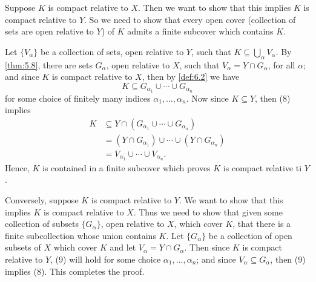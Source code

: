 \documentclass[leqno]{article}
\makeatletter
\theoremstyle{definition}
\theoremstyle{remark}
\let\oldproofname=\proofname
\renewcommand{\proofname}{\bf{\textit{\oldproofname}}}
\renewenvironment{proof}[1][\proofname]{\par
  \pushQED{\qed}%
  \normalfont \topsep6\p@\@plus6\p@\relax
  \list{}{\leftmargin=0mm
          \rightmargin=0mm
          \settowidth{\itemindent}{\itshape#1}%
          \labelwidth=4mm
          \parsep=0pt \listparindent=0mm%
  }
  \item[\hskip\labelsep
        \itshape
    #1\@addpunct{.}]\ignorespaces
}{%
  \popQED\endlist\@endpefalse
}
\makeatother
\begin{document}
                \begin{proof}
                    Suppose $K$ is compact relative to $X$. Then we want to show that this implies $K$ is compact relative to $Y$. So we need to show that every open cover (collection of sets are open relative to $Y$) of $K$ admits a finite subcover which contains $K$.\par\hspace{4mm} Let $\{V_{\alpha}\}$ be a collection of sets, open relative to $Y$, such that $K\subseteq\bigcup_{\alpha}V_{\alpha}$. By \cref{thm:5.8}, there are sets $G_{\alpha}$, open relative to $X$, such that $V_{\alpha}=Y\cap G_{\alpha}$, for all $\alpha$; and since $K$ is compact relative to $X$, then by \cref{def:6.2} we have
                        \begin{equation}
                            K\subseteq G_{\alpha_1}\cup\cdots\cup G_{\alpha_n}
                        \end{equation}
                    for some choice of finitely many indices $\alpha_1,\dots,\alpha_n$. Now since $K\subseteq Y$, then (8) implies
                        \begin{equation}
                            \begin{split}
                                K&\subseteq Y\cap(G_{\alpha_1}\cup\cdots\cup G_{\alpha_n}) \\
                                &=(Y\cap G_{\alpha_1})\cup\cdots\cup(Y\cap G_{\alpha_n}) \\
                                &= V_{\alpha_1}\cup\cdots\cup V_{\alpha_n}.
                            \end{split}
                        \end{equation}
                    Hence, $K$ is contained in a finite subcover which proves $K$ is compact relative ti $Y$.\par\hspace{4mm} Conversely, suppose $K$ is compact relative to $Y$. We want to show that this implies $K$ is compact relative to $X$. Thus we need to show that given some collection of subsets $\{G_{\alpha}\}$, open relative to $X$, which cover $K$, that there is a finite subcollection whose union contains $K$. Let $\{G_{\alpha}\}$ be a collection of open subsets of $X$ which cover $K$ and let $V_{\alpha}=Y\cap G_{\alpha}$. Then since $K$ is compact relative to $Y$, (9) will hold for some choice $\alpha_1,\dots,\alpha_n$; and since $V_{\alpha}\subseteq G_{\alpha}$, then (9) implies (8). This completes the proof.
                \end{proof}
\end{document}
